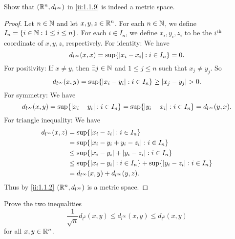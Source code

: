 \begin{ex}\label{ii:ex:1.1.9}
  Show that \((\mathbb{R}^n, d_{l^\infty})\) in \cref{ii:1.1.9} is indeed a metric space.
\end{ex}

\begin{proof}
  Let \(n \in \mathbb{N}\) and let \(x, y, z \in \mathbb{R}^n\).
  For each \(n \in \mathbb{N}\), we define \(I_n = \left\lbrace i \in \mathbb{N} : 1 \leq i \leq n\right\rbrace\).
  For each \(i \in I_n\), we define \(x_i, y_i, z_i\) to be the \(i^{\operatorname{th}}\) coordinate of \(x, y, z\), respectively.
  For identity:
  We have
  \[
    d_{l^\infty}(x, x) = \sup \set{\abs{x_i - x_i} : i \in I_n} = 0.
  \]
  For positivity:
  If \(x \neq y\), then \(\exists j \in \mathbb{N}\) and \(1 \leq j \leq n\) such that \(x_j \neq y_j\).
  So
  \[
    d_{l^\infty}(x, y) = \sup \set{\abs{x_i - y_i} : i \in I_n} \geq \abs{x_j - y_j} > 0.
  \]
  For symmetry:
  We have
  \[
    d_{l^\infty}(x, y) = \sup \set{\abs{x_i - y_i} : i \in I_n} = \sup \set{\abs{y_i - x_i} : i \in I_n} = d_{l^\infty}(y, x).
  \]
  For triangle inequality:
  We have
  \begin{align*}
    d_{l^\infty}(x, z) & = \sup \set{\abs{x_i - z_i} : i \in I_n}                                             \\
                       & = \sup \set{\abs{x_i - y_i + y_i - z_i} : i \in I_n}                                 \\
                       & \leq \sup \set{\abs{x_i - y_i} + \abs{y_i - z_i} : i \in I_n}                        \\
                       & \leq \sup \set{\abs{x_i - y_i} : i \in I_n} + \sup \set{\abs{y_i - z_i} : i \in I_n} \\
                       & = d_{l^\infty}(x, y) + d_{l^\infty}(y, z).
  \end{align*}
  Thus by \cref{ii:1.1.2} \((\mathbb{R}^n, d_{l^\infty})\) is a metric space.
\end{proof}

\begin{ex}\label{ii:ex:1.1.10}
  Prove the two inequalities
  \[
    \dfrac{1}{\sqrt{n}} d_{l^2}(x, y) \leq d_{l^\infty}(x, y) \leq d_{l^2}(x, y)
  \]
  for all \(x, y \in \mathbb{R}^n\).
\end{ex}

